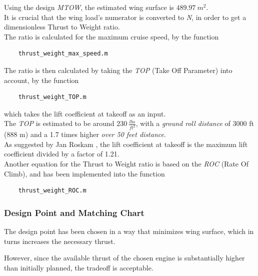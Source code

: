 \documentclass{article}
\begin{document}
Using the design \textit{MTOW}, the estimated wing surface is $489.97 \ m^2$. \\ 

It is crucial that the wing load's numerator is converted to \textit{N}, in order to get a dimensionless
Thrust to Weight ratio.\\ 
The ratio is calculated for the maximum cruise speed, by the function 
\begin{verbatim}
    thrust_weight_max_speed.m
\end{verbatim}



\clearpage

The ratio is then calculated by taking the \textit{TOP} (Take Off Parameter) into account, by the function 
\begin{verbatim}
    thrust_weight_TOP.m
\end{verbatim}
which takes the lift coefficient at takeoff as an input.\\ 

The \textit{TOP} is estimated to be around $230 \ \frac{lbs}{ft^2}$, with a \textit{ground roll distance}
of 3000 ft (888 m) and a 1.7 times higher \textit{over 50 feet distance}.\\ 
As suggested by Jan Roskam \autocite{Roskam}, the lift coefficient at takeoff is the maximum lift coefficient
divided by a factor of 1.21. \\ 

Another equation for the Thrust to Weight ratio is based on the \textit{ROC} (Rate Of Climb), 
and has been implemented into the function

\begin{verbatim}
    thrust_weight_ROC.m
\end{verbatim}
\clearpage
\subsubsection{Design Point and Matching Chart\label{Matching_chart}}

The design point has been chosen in a way that minimizes wing surface, which in turns
increases the necessary thrust.

However, since the available thrust of the chosen engine is substantially higher than initially
planned, the tradeoff is acceptable.
\end{document}
